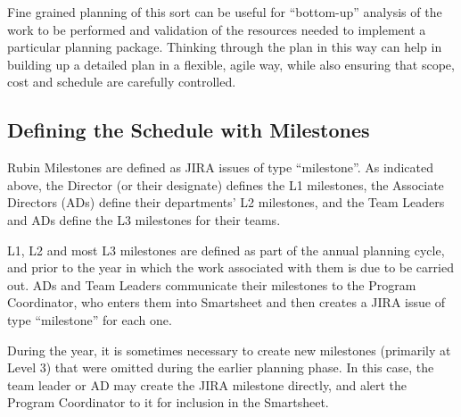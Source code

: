 Fine grained planning of this sort can be useful for ``bottom-up''
analysis of the work to be performed and validation of the resources
needed to implement a particular planning package. Thinking through the
plan in this way can help in building up a detailed plan in a flexible,
agile way, while also ensuring that scope, cost and schedule are
carefully controlled.


\subsection{Defining the Schedule with Milestones}

Rubin Milestones are defined as \gls{JIRA} issues of type ``milestone''. As indicated above, the Director (or their designate) defines the L1 milestones, the Associate Directors (ADs) define their departments' L2 milestones, and the Team Leaders and ADs define the L3 milestones for their teams.

L1, L2 and most L3 milestones are defined as part of the annual planning cycle, and prior to the year in which the work associated with them is due to be carried out. ADs and Team Leaders communicate their milestones to the Program Coordinator, who enters them into Smartsheet and then creates a \gls{JIRA} issue of type ``milestone'' for each one.

During the year, it is sometimes necessary to create new milestones (primarily at Level 3) that were omitted during the earlier planning phase. In this case, the team leader or AD may create the \gls{JIRA} milestone directly, and alert the Program Coordinator to it for inclusion in the Smartsheet.

